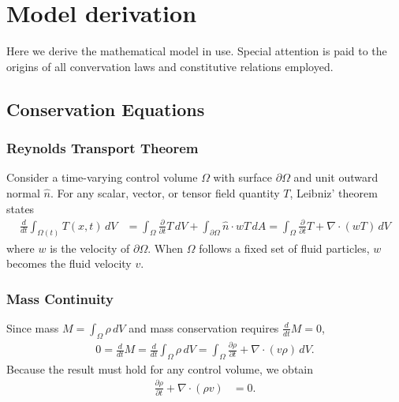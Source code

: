 \documentclass[letterpaper,11pt,nointlimits]{amsart}
\begin{document}
\section{Model derivation}

Here we derive the mathematical model in use.  Special attention is paid
to the origins of all convervation laws and constitutive relations employed.

\subsection{Conservation Equations}

\subsubsection{Reynolds Transport Theorem}

Consider a time-varying control volume $\Omega$ with surface
$\partial\Omega$ and unit outward normal $\hat{n}$.  For any 
scalar, vector, or tensor field quantity
$T$, Leibniz' theorem states
\begin{align}
  \label{eq:rtt}
  \frac{d}{dt}\int_{\Omega(t)}T(x,t)\,dV
  &=
  \int_{\Omega}\frac{\partial}{\partial{}t}T\,dV
  +
  \int_{\partial\Omega} \hat{n}\cdot{}w T\,dA
  =
  \int_{\Omega}\frac{\partial}{\partial{}t}T+\nabla\cdot(wT)\,dV
\end{align}
where $w$ is the velocity of $\partial\Omega$.  When $\Omega$ follows
a fixed set of fluid particles, $w$ becomes the fluid velocity $v$.

\subsubsection{Mass Continuity} 
Since mass $M=\int_{\Omega} \rho\,dV$
and mass conservation requires $\frac{d}{dt}M=0$,
\begin{align}
  0 = \frac{d}{dt}M 
  = \frac{d}{dt}\int_{\Omega} \rho\,dV
  =
  \int_{\Omega}\frac{\partial\rho}{\partial{}t}+\nabla\cdot(v\rho{})\,dV.
\end{align}
Because the result must hold for any control volume, we obtain
\begin{align}
  \label{eq:cons_mass}
  \frac{\partial\rho}{\partial{}t}+\nabla\cdot(\rho{}v) &= 0
  .
\end{align}
\end{document}
